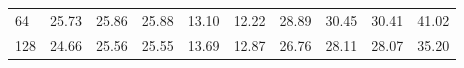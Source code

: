 \begin{tabular}{lrrrrrrrrr}
64 & {\cellcolor[HTML]{F1FAEE}} \color[HTML]{000000} 25.73 & {\cellcolor[HTML]{F0F9EC}} \color[HTML]{000000} 25.86 & {\cellcolor[HTML]{EFF9EC}} \color[HTML]{000000} 25.88 & {\cellcolor[HTML]{F7FCF5}} \color[HTML]{000000} 13.10 & {\cellcolor[HTML]{F7FCF5}} \color[HTML]{000000} 12.22 & {\cellcolor[HTML]{C9EAC2}} \color[HTML]{000000} 28.89 & {\cellcolor[HTML]{ABDDA5}} \color[HTML]{000000} 30.45 & {\cellcolor[HTML]{ACDEA6}} \color[HTML]{000000} 30.41 & {\cellcolor[HTML]{00441B}} \color[HTML]{F1F1F1} 41.02 \\
128 & {\cellcolor[HTML]{F7FCF5}} \color[HTML]{000000} 24.66 & {\cellcolor[HTML]{EFF9EC}} \color[HTML]{000000} 25.56 & {\cellcolor[HTML]{F0F9EC}} \color[HTML]{000000} 25.55 & {\cellcolor[HTML]{F7FCF5}} \color[HTML]{000000} 13.69 & {\cellcolor[HTML]{F7FCF5}} \color[HTML]{000000} 12.87 & {\cellcolor[HTML]{DAF0D4}} \color[HTML]{000000} 26.76 & {\cellcolor[HTML]{B6E2AF}} \color[HTML]{000000} 28.11 & {\cellcolor[HTML]{B8E3B2}} \color[HTML]{000000} 28.07 & {\cellcolor[HTML]{00441B}} \color[HTML]{F1F1F1} 35.20 \\
\end{tabular}
